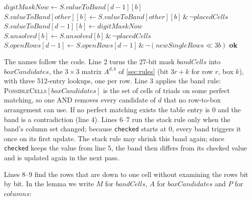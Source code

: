\documentclass[11pt]{article}
\theoremstyle{definition}
\theoremstyle{plain}
\let\origtextsc\textsc
\renewcommand{\textsc}[1]{\textup{\origtextsc{#1}}}
\begin{document}
\begin{algorithm}[H]
\begin{algorithmic}[1]
  \State $\mathit{digitMaskNow} \gets S.\mathit{valueToBand}[d-1][b]$ 
   $S.\mathit{valueToBand}[\mathit{other}][b] \gets S.\mathit{valueToBand}[\mathit{other}][b] \,\&\, \lnot\mathit{placedCells}$ \EndFor
  \State $S.\mathit{valueToBand}[d-1][b] \gets \mathit{digitMaskNow}$ 
  \State $S.\mathit{unsolved}[b] \gets S.\mathit{unsolved}[b] \,\&\, \lnot\mathit{placedCells}$
  \Statex \hspace{\algorithmicindent}$S.\mathit{openRows}[d-1] \gets S.\mathit{openRows}[d-1] \,\&\, \lnot(\mathit{newSingleRows}\ll 3b)$
\EndIf
\State \Return \textbf{ok}
\end{algorithmic}
\end{algorithm}



The names follow the code. Line 2 turns the 27-bit mask $\mathit{bandCells}$ into $\mathit{boxCandidates}$, the
$3\times 3$ matrix $A^{d,b}$ of \cref{sec:rules} (bit $3r+k$ for row $r$, box $k$), with three 512-entry lookups, one per
row. Line 3 applies the band rule: \textsc{PossibleCells}$[\mathit{boxCandidates}]$ is the set of cells of triads on
some perfect matching, so one AND removes every candidate of $d$ that no row-to-box arrangement can use. If no perfect matching
exists the table entry is 0 and the band is a contradiction (line 4). Lines 6--7 run the stack rule only when the
band's column set changed; because \texttt{checked} starts at 0, every band triggers it once on its first update. The
stack rule may shrink this band again; since \texttt{checked} keeps the value from line 5, the band then differs from
its checked value and is updated again in the next pass.

Lines 8--9 find the rows that are down to one cell without examining the rows bit by bit. In the lemma we write
$M$ for $\mathit{bandCells}$, $A$ for $\mathit{boxCandidates}$ and $P$ for $\mathit{columns}$:
\end{document}
